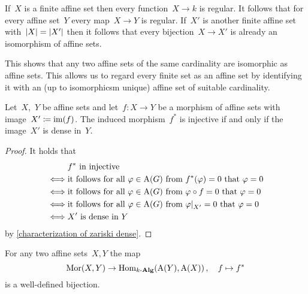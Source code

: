 \begin{fluff}
  If~$X$ is a finite affine set then every function~$X \to k$ is regular.
  It follows that for every affine set~$Y$ every map~$X \to Y$ is regular.
  If~$X'$ is another finite affine set with~$\lvert X\rvert = \lvert X'\rvert$ then it follows that every bijection~$X \to X'$ is already an isomorphism of affine sets.


  This shows that any two affine sets of the same cardinality are isomorphic as affine sets.
  This allows us to regard every finite set as an affine set by identifying it with an (up to isomorphicsm unique) affine set of suitable cardinality.
\end{fluff}


\begin{lemma}
  Let~$X$,~$Y$ be affine sets and let~$f \colon X \to Y$ be a morphism of affine sets with image~$X' \coloneqq \operatorname{im}(f)$.
  The induced morphism~$f^*$ is injective if and only if the image~$X'$ is dense in~$Y$.
\end{lemma}


\begin{proof}
  \leavevmode
  It holds that
  \begin{align*}
        &{} \text{$f^*$ in injective} \\
    \iff&{} \text{it follows for all~$\varphi \in \coord(G)$ from~$f^*(\varphi) = 0$ that~$\varphi = 0$} \\
    \iff&{} \text{it follows for all~$\varphi \in \coord(G)$ from~$\varphi \circ f = 0$ that~$\varphi = 0$} \\
    \iff&{} \text{it follows for all~$\varphi \in \coord(G)$ from~$\restrict{\varphi}{X'} = 0$ that~$\varphi = 0$} \\
    \iff&{} \text{$X'$ is dense in~$Y$}
  \end{align*}
  by \cref{characterization of zariski dense}.
\end{proof}



\begin{proposition}
  \label{coordinate ring is fully faithful}
  For any two affine sets~$X,Y$ the map
  \[
            \operatorname{Mor}(X, Y)
    \to     \operatorname{Hom}_{k\text{-}\mathbf{Alg}}( \operatorname{A}(Y), \operatorname{A}(X) ) \,,
    \quad   f
    \mapsto f^*
  \]
  is a well-defined bijection.
\end{proposition}


